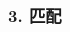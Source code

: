 \documentclass{beamer}
\theoremstyle{definition}
\theoremstyle{example}
\begin{document}
\begin{CJK}{UTF8}{gbsn}








\begin{frame}
  \frametitle{3. 匹配}


\end{frame}
\end{CJK}
\end{document}
